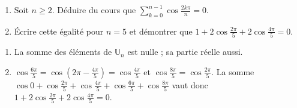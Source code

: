 \begin{exercise}
\begin{enumerate}
\item Soit $n\ge2$. Déduire du cours que $\displaystyle\sum_{k=0}^{n-1}\cos\frac{2k\pi}n=0$.
\item Écrire cette égalité pour $n=5$ et démontrer que $1+2\cos\frac{2\pi}5+2\cos\frac{4\pi}5=0$.
\end{enumerate}
\end{exercise}
\begin{solution}
\begin{enumerate}
\item La somme des éléments de $\mathbb U_n$ est nulle ; sa partie réelle aussi.
\item $\cos\frac{6\pi}5=\cos\left(2\pi-\frac{4\pi}5\right)=\cos\frac{4\pi}5$ et $\cos\frac{8\pi}5=\cos\frac{2\pi}5$. La somme $\cos0+\cos\frac{2\pi}5+\cos\frac{4\pi}5+\cos\frac{6\pi}5+\cos\frac{8\pi}5$ vaut donc $1+2\cos\frac{2\pi}5+2\cos\frac{4\pi}5=0$.
\end{enumerate}
\end{solution}

\mxnewpage
